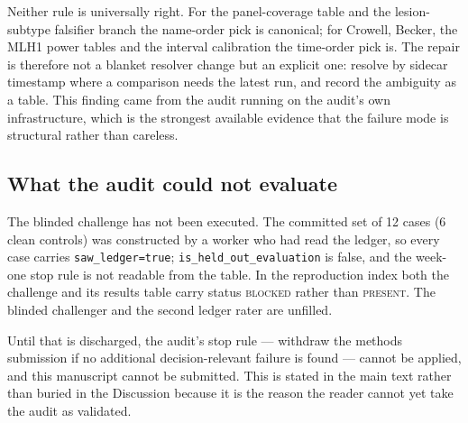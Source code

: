 Neither rule is universally right. For the panel-coverage table and the
lesion-subtype falsifier branch the name-order pick is canonical; for Crowell,
Becker, the MLH1 power tables and the interval calibration the time-order pick is.
The repair is therefore not a blanket resolver change but an explicit one:
resolve by sidecar timestamp where a comparison needs the latest run, and record
the ambiguity as a table. This finding came from the audit running on the audit's
own infrastructure, which is the strongest available evidence that the failure
mode is structural rather than careless.

\subsection{What the audit could not evaluate}
\label{sec:not-evaluated}

The blinded challenge has not been executed. The committed set of 12 cases (6
clean controls) was constructed by a worker who had read the ledger, so every
case carries \texttt{saw\_ledger=true}; \texttt{is\_held\_out\_evaluation} is
false, and the week-one stop rule is not readable from the table. In the
reproduction index both the challenge and its results table carry status
\textsc{blocked} rather than \textsc{present}. The blinded challenger and the
second ledger rater are unfilled.

Until that is discharged, the audit's stop rule --- withdraw the methods
submission if no additional decision-relevant failure is found --- cannot be
applied, and this manuscript cannot be submitted. This is stated in the main text
rather than buried in the Discussion because it is the reason the reader cannot
yet take the audit as validated.
